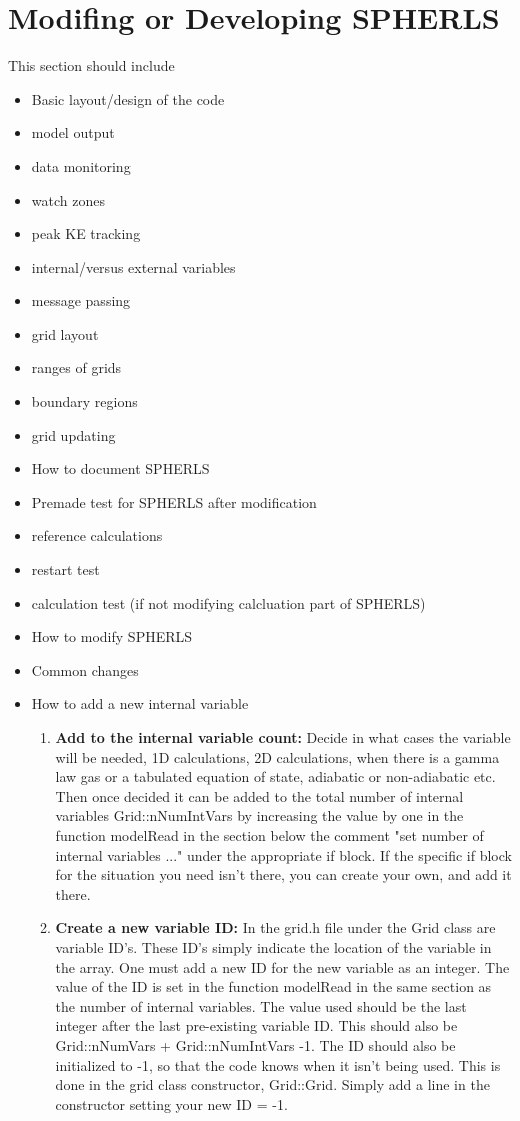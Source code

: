 \documentclass[11pt]{article}
\begin{document}
\section{Modifing or Developing SPHERLS}
This section should include
\begin{itemize}
\item Basic layout/design of the code
\item model output
\item data monitoring
\item watch zones
\item peak KE tracking
\item internal/versus external variables
\item message passing
\item grid layout
\item ranges of grids
\item boundary regions
\item grid updating
\item How to document SPHERLS
\item Premade test for SPHERLS after modification
\item reference calculations
\item restart test
\item calculation test (if not modifying calcluation part of SPHERLS)
\item How to modify SPHERLS
\item Common changes
\item How to add a new internal variable
\begin{enumerate}
\item \textbf{Add to the internal variable count:} Decide in what cases the variable will be needed, 1D calculations, 2D calculations, when there is a gamma law gas or a tabulated equation of state, adiabatic or non-adiabatic etc. Then once decided it can be added to the total number of internal variables Grid::nNumIntVars by increasing the value by one in the function modelRead in the section below the comment "set number of internal variables ..." under the appropriate if block. If the specific if block for the situation you need isn't there, you can create your own, and add it there.
\item \textbf{Create a new variable ID:} In the grid.h file under the Grid class are variable ID's. These ID's simply indicate the location of the variable in the array. One must add a new ID for the new variable as an integer. The value of the ID is set in the function modelRead in the same section as the number of internal variables. The value used should be the last integer after the last pre-existing variable ID. This should also be Grid::nNumVars + Grid::nNumIntVars -1. The ID should also be initialized to -1, so that the code knows when it isn't being used. This is done in the grid class constructor, Grid::Grid. Simply add a line in the constructor setting your new ID = -1.

\end{enumerate}
\end{itemize}
\end{document}
